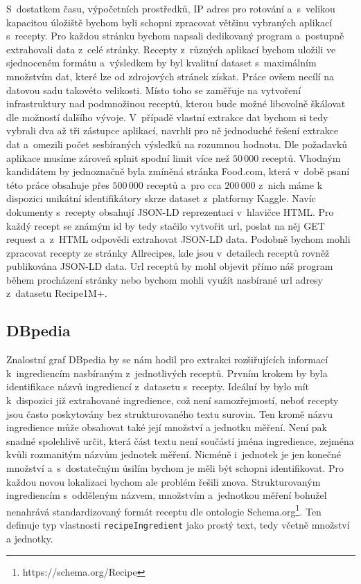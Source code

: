S~dostatkem času, výpočetních prostředků, IP adres pro rotování a~s~velikou kapacitou úložiště bychom byli schopni zpracovat většinu vybraných aplikací s~recepty. Pro každou stránku bychom napsali dedikovaný program a~postupně extrahovali data z~celé stránky. Recepty z~různých aplikací bychom uložili ve sjednoceném formátu a~výsledkem by byl kvalitní dataset s~maximálním množstvím dat, které lze od zdrojových stránek získat. Práce ovšem necílí na datovou sadu takovéto velikosti. Místo toho se zaměřuje na vytvoření infrastruktury nad podmnožinou receptů, kterou bude možné libovolně škálovat dle možností dalšího vývoje. V~případě vlastní extrakce dat bychom si tedy vybrali dva až tři zástupce aplikací, navrhli pro ně jednoduché řešení extrakce dat a~omezili počet sesbíraných výsledků na rozumnou hodnotu. Dle požadavků aplikace musíme zároveň splnit spodní limit více než $50\,000$ receptů. Vhodným kandidátem by jednoznačně byla zmíněná stránka Food.com, která v~době psaní této práce obsahuje přes $500\,000$ receptů a~pro cca $200\,000$ z~nich máme k dispozici unikátní identifikátory skrze dataset z~platformy Kaggle. Navíc dokumenty s~recepty obsahují JSON-LD reprezentaci v~hlavičce HTML. Pro každý recept se známým id by tedy stačilo vytvořit url, poslat na něj GET request a~z~HTML odpovědi extrahovat JSON-LD data. Podobně bychom mohli zpracovat recepty ze stránky Allrecipes, kde jsou v~detailech receptů rovněž publikována JSON-LD data. Url receptů by mohl objevit přímo náš program během procházení stránky nebo bychom mohli využít nasbírané url adresy z~datasetu Recipe1M+.

\subsection{DBpedia}

Znalostní graf DBpedia by se nám hodil pro extrakci rozšiřujících informací k~ingrediencím nasbíraným z~jednotlivých receptů. Prvním krokem by byla identifikace názvů ingrediencí z~datasetu s~recepty. Ideální by bylo mít k~dispozici již extrahované ingredience, což není samozřejmostí, neboť recepty jsou často poskytovány bez strukturovaného textu surovin. Ten kromě názvu ingredience může obsahovat také její množství a jednotku měření. Není pak snadné spolehlivě určit, která část textu není součástí jména ingredience, zejména kvůli rozmanitým názvům jednotek měření. Nicméně i~jednotek je jen konečné množství a~s~dostatečným úsilím bychom je měli být schopni identifikovat. Pro každou novou lokalizaci bychom ale problém řešili znova. Strukturovaným ingrediencím s~odděleným názvem, množstvím a~jednotkou měření bohužel nenahrává standardizovaný formát receptu dle ontologie Schema.org\footnote{https://schema.org/Recipe}. Ten definuje typ vlastnosti \texttt{recipeIngredient} jako prostý text, tedy včetně množství a jednotky.


